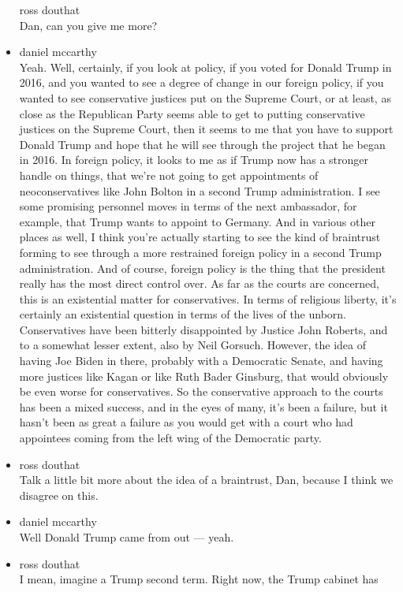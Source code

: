 \begin{itemize}
  ross douthat\\
  Dan, can you give me more?
\item
  daniel mccarthy\\
  Yeah. Well, certainly, if you look at policy, if you voted for Donald
  Trump in 2016, and you wanted to see a degree of change in our foreign
  policy, if you wanted to see conservative justices put on the Supreme
  Court, or at least, as close as the Republican Party seems able to get
  to putting conservative justices on the Supreme Court, then it seems
  to me that you have to support Donald Trump and hope that he will see
  through the project that he began in 2016. In foreign policy, it looks
  to me as if Trump now has a stronger handle on things, that we're not
  going to get appointments of neoconservatives like John Bolton in a
  second Trump administration. I see some promising personnel moves in
  terms of the next ambassador, for example, that Trump wants to appoint
  to Germany. And in various other places as well, I think you're
  actually starting to see the kind of braintrust forming to see through
  a more restrained foreign policy in a second Trump administration. And
  of course, foreign policy is the thing that the president really has
  the most direct control over. As far as the courts are concerned, this
  is an existential matter for conservatives. In terms of religious
  liberty, it's certainly an existential question in terms of the lives
  of the unborn. Conservatives have been bitterly disappointed by
  Justice John Roberts, and to a somewhat lesser extent, also by Neil
  Gorsuch. However, the idea of having Joe Biden in there, probably with
  a Democratic Senate, and having more justices like Kagan or like Ruth
  Bader Ginsburg, that would obviously be even worse for conservatives.
  So the conservative approach to the courts has been a mixed success,
  and in the eyes of many, it's been a failure, but it hasn't been as
  great a failure as you would get with a court who had appointees
  coming from the left wing of the Democratic party.
\item
  ross douthat\\
  Talk a little bit more about the idea of a braintrust, Dan, because I
  think we disagree on this.
\item
  daniel mccarthy\\
  Well Donald Trump came from out --- yeah.
\item
  ross douthat\\
  I mean, imagine a Trump second term. Right now, the Trump cabinet has

\end{itemize}
